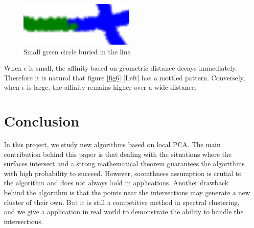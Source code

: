 \documentclass[twoside,11pt]{article}
\begin{document}
\begin{figure}[htbp]
\centering
\includegraphics[width=0.3  \textwidth]{boundary.png}
\vspace{-1em}
\caption{Small green circle buried in the line}
\label{fig7}
\end{figure}

When $\epsilon$ is small, the affinity based on geometric distance decays immediately. Therefore it is natural that figure \ref{fig6} [Left] has a mottled  pattern. Conversely, when $\epsilon$ is large, the affinity remains higher over a wide distance.

\section{Conclusion}
In this project, we study new algorithms based on local PCA. The main contribution behind this paper is that dealing with the situations where the surfaces intersect and a strong mathematical theorem guarantees the algorithms with high probability to succeed. However, soomthness assumption is crutial to the algorithm and does not always hold in applications. Another drawback behind the algorithm is that the points near the intersections may generate a new cluster of their own. But it is still a competitive method in spectral clustering, and we give a application in real world to demonstrate the ability to handle the intersections.

                




\newpage

\appendix

\vskip 0.2in
% 
% 

\end{document}
